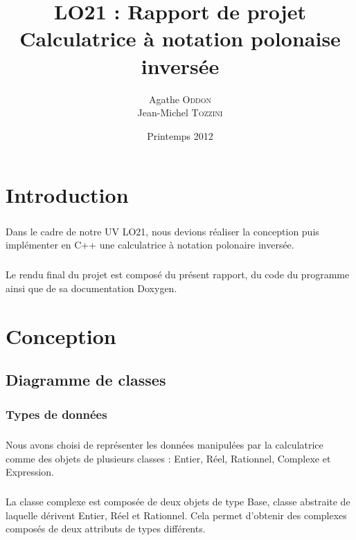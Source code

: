 \documentclass[a4paper,12pt]{report}
\begin{document}
\title{LO21 : Rapport de projet \\ Calculatrice à notation polonaise inversée}
\author{Agathe \textsc{Oddon} \\ Jean-Michel \textsc{Tozzini}}
\date{Printemps 2012}

\maketitle

\chapter*{Introduction}
	\paragraph{}Dans le cadre de notre UV LO21, nous devions réaliser la conception puis implémenter en C++ une calculatrice à notation polonaire inversée.

	\paragraph{}Le rendu final du projet est composé du présent rapport, du code du programme ainsi que de sa documentation Doxygen.

\tableofcontents

\chapter{Conception}

	\section{Diagramme de classes}
		
		\subsection{Types de données}
			\paragraph{}Nous avons choisi de représenter les données manipulées par la calculatrice comme des objets de plusieurs classes : Entier, Réel, Rationnel, Complexe et Expression. 

			\paragraph{}La classe complexe est composée de deux objets de type Base, classe abstraite de laquelle dérivent Entier, Réel et Rationnel. Cela permet d'obtenir des complexes composés de deux attributs de types différents.
\end{document}
